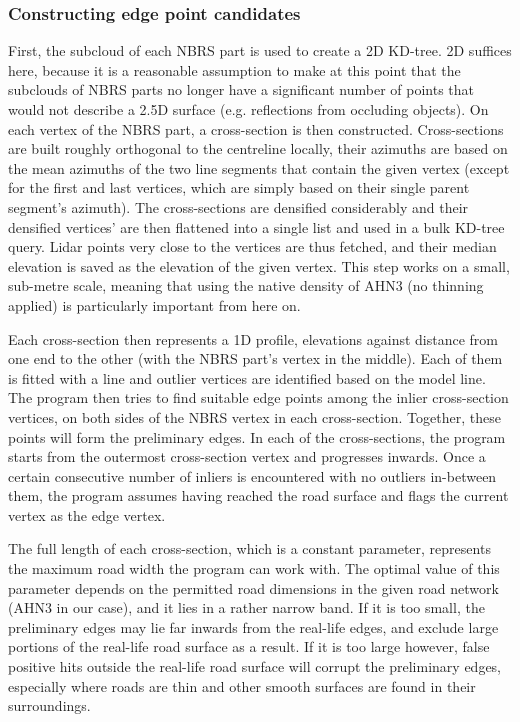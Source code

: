 \subsubsection{Constructing edge point candidates}

First, the subcloud of each NBRS part is used to create a 2D KD-tree. 2D suffices here, because it is a reasonable assumption to make at this point that the subclouds of NBRS parts no longer have a significant number of points that would not describe a 2.5D surface (e.g. reflections from occluding objects). On each vertex of the NBRS part, a cross-section is then constructed. Cross-sections are built roughly orthogonal to the centreline locally, their azimuths are based on the mean azimuths of the two line segments that contain the given vertex (except for the first and last vertices, which are simply based on their single parent segment's azimuth). The cross-sections are densified considerably and their densified vertices' are then flattened into a single list and used in a bulk KD-tree query. Lidar points very close to the vertices are thus fetched, and their median elevation is saved as the elevation of the given vertex. This step works on a small, sub-metre scale, meaning that using the native density of AHN3 (no thinning applied) is particularly important from here on.

Each cross-section then represents a 1D profile, elevations against distance from one end to the other (with the NBRS part's vertex in the middle). Each of them is fitted with a line and outlier vertices are identified based on the model line. The program then tries to find suitable edge points among the inlier cross-section vertices, on both sides of the NBRS vertex in each cross-section. Together, these points will form the preliminary edges. In each of the cross-sections, the program starts from the outermost cross-section vertex and progresses inwards. Once a certain consecutive number of inliers is encountered with no outliers in-between them, the program assumes having reached the road surface and flags the current vertex as the edge vertex.

The full length of each cross-section, which is a constant parameter, represents the maximum road width the program can work with. The optimal value of this parameter depends on the permitted road dimensions in the given road network (AHN3 in our case), and it lies in a rather narrow band. If it is too small, the preliminary edges may lie far inwards from the real-life edges, and exclude large portions of the real-life road surface as a result. If it is too large however, false positive hits outside the real-life road surface will corrupt the preliminary edges, especially where roads are thin and other smooth surfaces are found in their surroundings.

